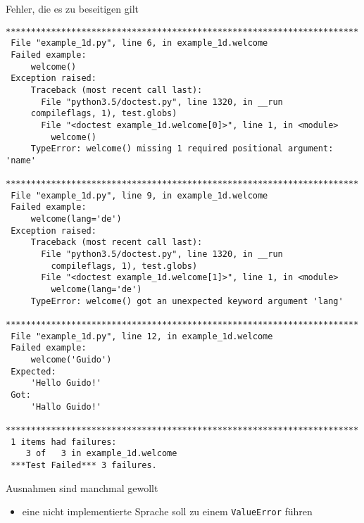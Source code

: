 \documentclass[t, utf8x, 10pt]{beamer}
\begin{document}
\begin{frame}[fragile]{Fehler, die es zu beseitigen gilt}
 \begin{tiny}
	 \begin{lstlisting}[language={}]
 **********************************************************************
 File "example_1d.py", line 6, in example_1d.welcome
 Failed example:
     welcome()
 Exception raised:
     Traceback (most recent call last):
       File "python3.5/doctest.py", line 1320, in __run
	 compileflags, 1), test.globs)
       File "<doctest example_1d.welcome[0]>", line 1, in <module>
         welcome()
     TypeError: welcome() missing 1 required positional argument: 'name'
 **********************************************************************
 File "example_1d.py", line 9, in example_1d.welcome
 Failed example:
     welcome(lang='de')
 Exception raised:
     Traceback (most recent call last):
       File "python3.5/doctest.py", line 1320, in __run
         compileflags, 1), test.globs)
       File "<doctest example_1d.welcome[1]>", line 1, in <module>
         welcome(lang='de')
     TypeError: welcome() got an unexpected keyword argument 'lang'
 **********************************************************************
 File "example_1d.py", line 12, in example_1d.welcome
 Failed example:
     welcome('Guido')
 Expected:
     'Hello Guido!'
 Got:
     'Hallo Guido!'
 **********************************************************************
 1 items had failures:
    3 of   3 in example_1d.welcome
 ***Test Failed*** 3 failures.
  \end{lstlisting}
 \end{tiny}
\end{frame}


\begin{frame}{Ausnahmen sind manchmal gewollt}
 \begin{tiny}
  
 \end{tiny}

 \begin{itemize}
  \item eine nicht implementierte Sprache soll zu einem \texttt{ValueError} führen
 \end{itemize}
\end{frame}
\end{document}
